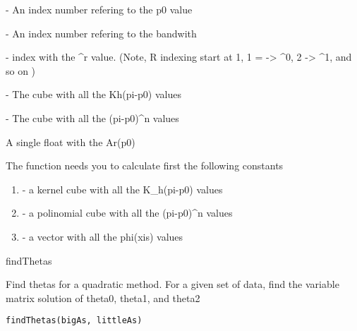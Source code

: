 \documentclass[letterpaper]{book}
\begin{document}
\begin{Arguments}
\begin{ldescription}
\item[\code{p0}] - An index number refering to the p0 value

\item[\code{h}] - An index number refering to the bandwith

\item[\code{r}] - index with the \textasciicircum{}r value. (Note, R indexing start at 1, 1 = -> \textasciicircum{}0, 2 -> \textasciicircum{}1, and so on )

\item[\code{kernelCube}] - The cube with all the Kh(pi-p0) values

\item[\code{poliCube}] - The cube with all the (pi-p0)\textasciicircum{}n values
\end{ldescription}
\end{Arguments}
%
\begin{Value}
A single float with the Ar(p0)
\end{Value}
%
\begin{Note}\relax
The function needs you to calculate first the following constants

\begin{enumerate}

\item{} - a kernel cube with all the K\_h(pi-p0) values
\item{} - a polinomial cube with all the (pi-p0)\textasciicircum{}n values
\item{} - a vector with all the phi(xis) values

\end{enumerate}

\end{Note}
%
\begin{SeeAlso}\relax
findThetas
\end{SeeAlso}
%
\begin{Description}\relax
Find thetas for a quadratic method.
For a given set of data, find the variable matrix solution of theta0, theta1, and theta2
\end{Description}
%
\begin{Usage}
\begin{verbatim}
findThetas(bigAs, littleAs)
\end{verbatim}
\end{Usage}
\end{document}
